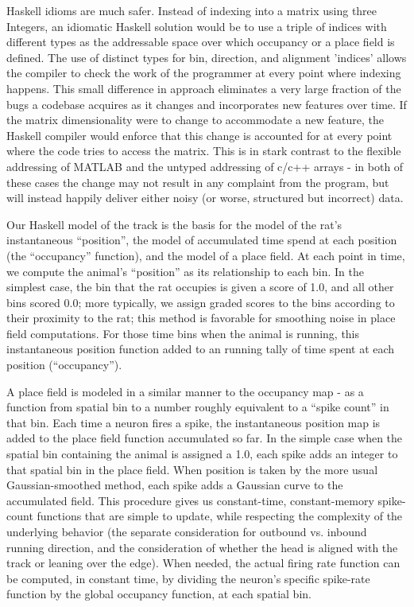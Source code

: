 \documentclass[]{article}
\begin{document}
Haskell idioms are much safer. Instead of indexing into a matrix using
three Integers, an idiomatic Haskell solution would be to use a triple
of indices with different types as the addressable space over which
occupancy or a place field is defined. The use of distinct types for
bin, direction, and alignment 'indices' allows the compiler to check the
work of the programmer at every point where indexing happens. This small
difference in approach eliminates a very large fraction of the bugs a
codebase acquires as it changes and incorporates new features over time.
If the matrix dimensionality were to change to accommodate a new
feature, the Haskell compiler would enforce that this change is
accounted for at every point where the code tries to access the matrix.
This is in stark contrast to the flexible addressing of MATLAB and the
untyped addressing of c/c++ arrays - in both of these cases the change
may not result in any complaint from the program, but will instead
happily deliver either noisy (or worse, structured but incorrect) data.

Our Haskell model of the track is the basis for the model of the rat's
instantaneous ``position'', the model of accumulated time spend at each
position (the ``occupancy'' function), and the model of a place field.
At each point in time, we compute the animal's ``position'' as its
relationship to each bin. In the simplest case, the bin that the rat
occupies is given a score of 1.0, and all other bins scored 0.0; more
typically, we assign graded scores to the bins according to their
proximity to the rat; this method is favorable for smoothing noise in
place field computations. For those time bins when the animal is
running, this instantaneous position function added to an running tally
of time spent at each position (``occupancy'').

A place field is modeled in a similar manner to the occupancy map - as a
function from spatial bin to a number roughly equivalent to a ``spike
count'' in that bin. Each time a neuron fires a spike, the instantaneous
position map is added to the place field function accumulated so far. In
the simple case when the spatial bin containing the animal is assigned a
1.0, each spike adds an integer to that spatial bin in the place field.
When position is taken by the more usual Gaussian-smoothed method, each
spike adds a Gaussian curve to the accumulated field. This procedure
gives us constant-time, constant-memory spike-count functions that are
simple to update, while respecting the complexity of the underlying
behavior (the separate consideration for outbound vs. inbound running
direction, and the consideration of whether the head is aligned with the
track or leaning over the edge). When needed, the actual firing rate
function can be computed, in constant time, by dividing the neuron's
specific spike-rate function by the global occupancy function, at each
spatial bin.
\end{document}
